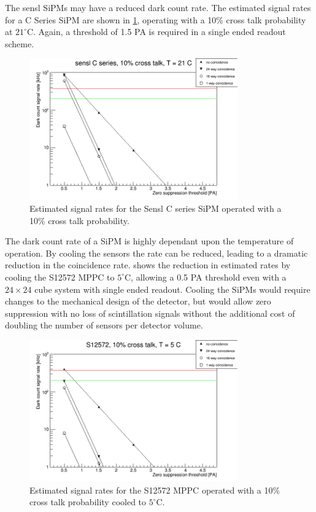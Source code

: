 \documentclass[a4paper]{article}
\begin{document}
The sensl SiPMs may have a reduced dark count rate.
The estimated signal rates for a C Series SiPM are shown in \cref{rates_sensl_10pct}, operating with a 10\% cross talk probability at $21^{\circ}$C.
Again, a threshold of 1.5 PA is required in a single ended readout scheme.

\begin{figure}[htp]
    \begin{center}
        \includegraphics[width=0.8\textwidth]{imgs/g_sensl_10pct}
        \caption{Estimated signal rates for the Sensl C series SiPM operated with a 10\% cross talk probability.}
        \label{rates_sensl_10pct}
    \end{center}
\end{figure}

The dark count rate of a SiPM is highly dependant upon the temperature of operation.
By cooling the sensors the rate can be reduced, leading to a dramatic reduction in the coincidence rate.
 shows the reduction in estimated rates by cooling the S12572 MPPC to $5^{\circ}$C, allowing a 0.5 PA threshold even with a $24\times24$ cube system with single ended readout.
Cooling the SiPMs would require changes to the mechanical design of the detector, but would allow zero suppression with no loss of scintillation signals without the additional cost of doubling the number of sensors per detector volume.

\begin{figure}[htp]
    \begin{center}
        \includegraphics[width=0.8\textwidth]{imgs/g_s12572_10pct_5C}
        \caption{Estimated signal rates for the S12572 MPPC operated with a 10\% cross talk probability cooled to $5^{\circ}$C.}
        \label{rates_s12572_10pct_5C}
    \end{center}
\end{figure}
\end{document}
